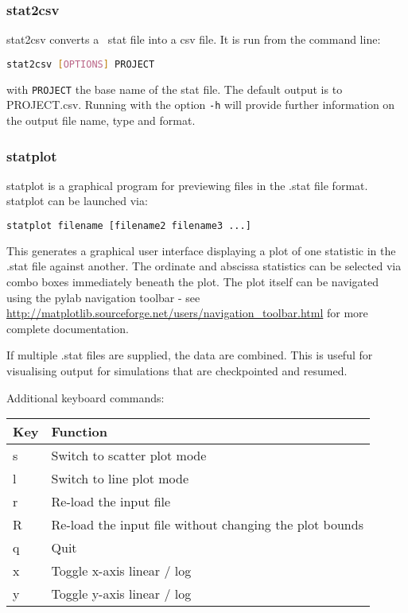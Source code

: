 
\subsubsection{stat2csv}
\label{sect:stat2csv}
stat2csv converts a \fluidity\ stat file into a csv file. It is run from the command line:
\begin{lstlisting}[language = Bash]
stat2csv [OPTIONS] PROJECT
\end{lstlisting} 
with \lstinline[language = Bash]+PROJECT+ the base name of the stat file. The default output is to PROJECT.csv. Running with the option \lstinline[language = Bash]+-h+ will provide further information on the output file name, type and format.


\subsubsection{statplot}
\label{sect:statplot}

statplot is a graphical program for previewing files in the .stat file format.
statplot can be launched via:

\begin{lstlisting}[language = Bash]
statplot filename [filename2 filename3 ...]
\end{lstlisting}

This generates a graphical user interface displaying a plot of one statistic in
the .stat file against another. The ordinate and abscissa statistics can be
selected via combo boxes immediately beneath the plot. The plot itself can
be navigated using the pylab navigation toolbar - see
\url{http://matplotlib.sourceforge.net/users/navigation_toolbar.html} for
more complete documentation.

If multiple .stat files are supplied, the data are combined. This is useful for
visualising output for simulations that are checkpointed and resumed. 

Additional keyboard commands:

\begin{center}
  \begin{tabular}{| l | l |}
    \hline
    Key & Function \\
    \hline
    s   & Switch to scatter plot mode \\
    l   & Switch to line plot mode \\
    r   & Re-load the input file \\
    R   & Re-load the input file without changing the plot bounds \\
    q   & Quit \\
    x   & Toggle x-axis linear / log \\
    y   & Toggle y-axis linear / log \\
    \hline
  \end{tabular}
\end{center}

